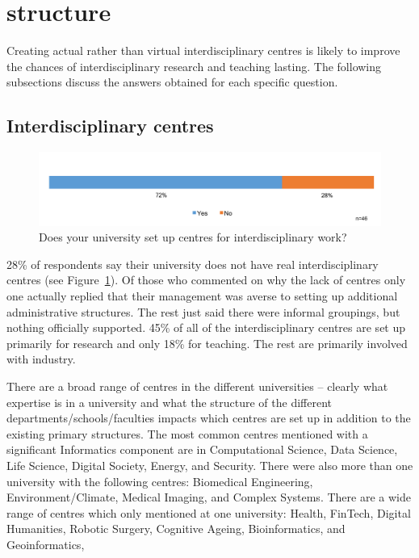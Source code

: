 \section{structure}

Creating actual rather than virtual interdisciplinary centres is likely to improve the chances of interdisciplinary research and teaching lasting. The following subsections discuss the answers obtained for each specific question.


\subsection{Interdisciplinary centres}

\begin{figure}[h]
\centering
\includegraphics[width = \linewidth]{charts/5a.png}
\caption{Does your university set up centres for interdisciplinary work?}
\label{sect5:centres}
\end{figure}

28\% of respondents say their university does not have real interdisciplinary centres (see Figure~\ref{sect5:centres}). Of those who commented on why the lack of centres only one actually replied that their management was averse to setting up additional administrative structures. The rest just said there were informal groupings, but nothing officially supported. 45\% of all of the interdisciplinary centres are set up primarily for research and only 18\% for teaching. The rest are primarily involved with industry.

There are a broad range of centres in the different universities -- clearly what expertise is in a university and what the structure of the different departments/schools/faculties impacts which centres are set up in addition to the existing primary structures. The most common centres mentioned with a significant Informatics component are in Computational Science, Data Science,  Life Science, Digital Society, Energy, and Security.   There were also more than one university with the following centres: Biomedical Engineering, Environment/Climate,  Medical Imaging, and  Complex Systems. There are a wide range of centres which only mentioned at one university: Health,  FinTech, Digital Humanities, Robotic Surgery, Cognitive Ageing, Bioinformatics, and Geoinformatics, 
 


